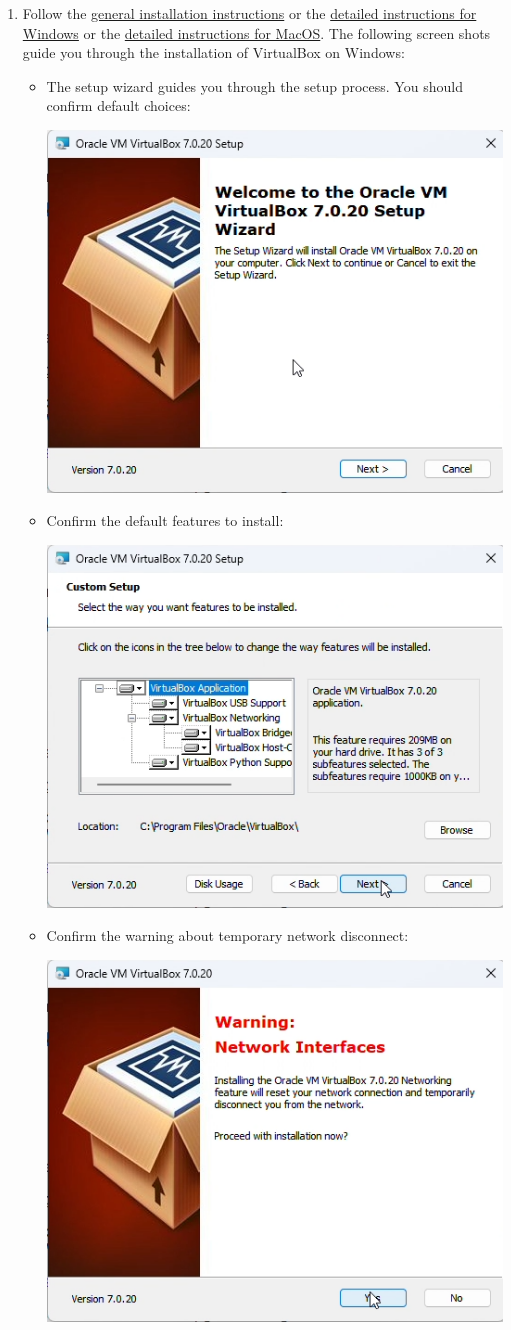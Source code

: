 \begin{enumerate}
\item Follow the \href{https://www.virtualbox.org/manual/ch01.html#intro-installing}{general installation instructions} or the \href{https://www.virtualbox.org/manual/ch02.html#installation_windows}{detailed instructions for Windows} or the \href{https://www.virtualbox.org/manual/ch02.html#installation-mac}{detailed instructions for MacOS}. The following screen shots guide you through the installation of VirtualBox on Windows:
   \begin{itemize}
   \item The setup wizard guides you through the setup process. You should confirm default choices:
      \begin{center}
      \includegraphics[width=.5\textwidth]{screen4.png}
      \end{center}
   \item Confirm the default features to install:
      \begin{center}
      \includegraphics[width=.5\textwidth]{screen5.png}
      \end{center}
   \item Confirm the warning about temporary network disconnect:
      \begin{center}
      \includegraphics[width=.5\textwidth]{screen6.png}

\end{center}
\end{itemize}
\end{enumerate}
